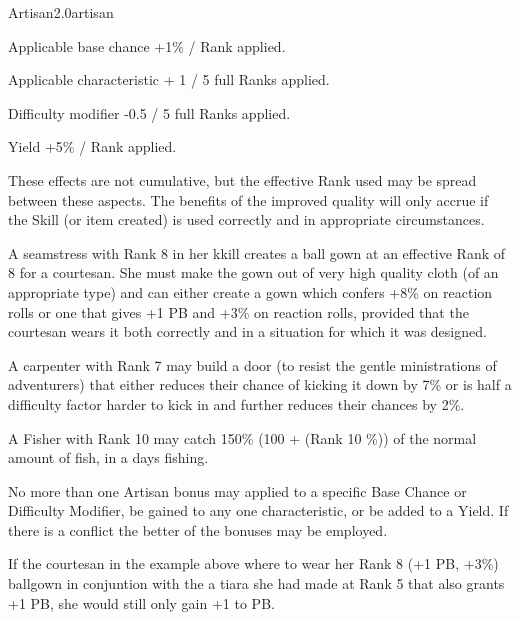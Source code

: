 \begin{skill}{Artisan}{2.0}{artisan}
\begin{Description}
\item[Applicable base chance]  +1\% / Rank applied.
\item[Applicable characteristic] + 1 / 5 full Ranks applied.
\item[Difficulty modifier] -0.5 / 5 full Ranks applied.
\item[Yield] +5\% / Rank applied.
\end{Description}

These effects are not cumulative, but the effective Rank used may be
spread between these aspects.  The benefits of the improved quality
will only accrue if the Skill (or item created) is used correctly and
in appropriate circumstances.

\begin{example}
A seamstress with Rank 8 in her kkill creates a ball gown at an
effective Rank of 8 for a courtesan.  She must make the gown out of
very high quality cloth (of an appropriate type) and can either create
a gown which confers +8\% on reaction rolls or one that gives +1 PB and
+3\% on reaction rolls, provided that the courtesan wears it both
correctly and in a situation for which it was designed.
\end{example}

\begin{example}
A carpenter with Rank 7 may build a door (to resist the gentle
ministrations of adventurers) that either reduces their chance of
kicking it down by 7\% or is half a difficulty factor harder to kick
in and further reduces their chances by 2\%.
\end{example}

\begin{example}
A Fisher with Rank 10 may catch 150\% (100 + (Rank 10 \%)) of the
normal amount of fish, in a days fishing.
\end{example}

No more than one Artisan bonus may applied to a specific Base Chance
or Difficulty Modifier, be gained to any one characteristic, or be
added to a Yield. If there is a conflict the better of the bonuses may
be employed.

\begin{example}
If the courtesan in the example above where to wear her Rank 8 (+1 PB,
+3\%) ballgown in conjuntion with the a tiara she had made at Rank 5
that also grants +1 PB, she would still only gain +1 to PB.
\end{example}


\end{skill}
